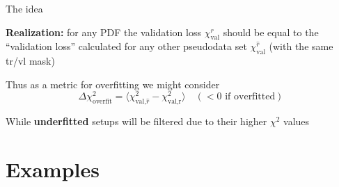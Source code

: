 \documentclass[aspectratio=169,11pt]{beamer}
\begin{document}
\begin{frame}[t]{The idea}

  \textbf{Realization:} for any PDF the validation loss $\chi^{r}_\text{val}$ should be equal to the ``validation loss'' calculated for any other pseudodata set  $\chi^{\hat{r}}_\text{val}$ (with the same tr/vl mask)\\\vspace*{1em}


  Thus as a metric for overfitting we might consider
  $$
  \Delta\chi^2_{\text{overfit}}=\langle \chi^{2}_\text{val,$\hat{r}$} - \chi^{2}_\text {val,r}\rangle\quad (<0 \text{ if overfitted})
  $$


  While \textbf{underfitted} setups will be filtered due to their higher $\chi^2$ values 

\end{frame}


\section*{Examples}
\end{document}
